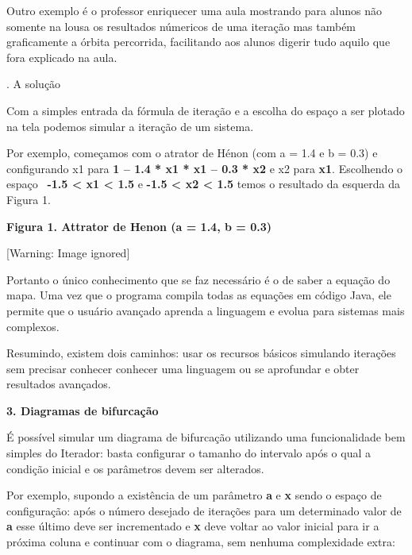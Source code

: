 \documentclass[a4paper,12pt]{article}
\begin{document}
{
 Outro exemplo \'e o professor enriquecer uma aula mostrando para alunos
n\~ao somente na lousa os resultados n\'umericos de uma itera\c{c}\~ao
mas tamb\'em graficamente a \'orbita percorrida, facilitando aos alunos
{\textquotedbl}digerir{\textquotedbl} tudo aquilo que fora explicado na
aula.}

{. A solu\c{c}\~ao}

{
Com a simples entrada da f\'ormula de itera\c{c}\~ao e a escolha do
espa\c{c}o a ser plotado na tela podemos simular a itera\c{c}\~ao de um
sistema.}

{
 Por exemplo, come\c{c}amos com o atrator de H\'enon (com a = 1.4 e b =
0.3) e configurando x1 para \textbf{1 {--} 1.4 * x1 * x1 {--} 0.3 * x2}
e x2 para \textbf{x1}\textmd{. Escolhendo o espa\c{c}o
\ }\textbf{{}-1.5 {\textless} x1 {\textless} 1.5 }\textmd{e
}\textbf{{}-1.5 {\textless} x2 {\textless} 1.5 }\textmd{temos o
resultado da esquerda da Figura 1.}}

{\centering{}\sffamily\bfseries
Figura 1. Attrator de Henon (a = 1.4, b = 0.3)
\par}

\begin{center}
 [Warning: Image ignored] %

\end{center}
{\mdseries
 Portanto o \'unico conhecimento que se faz necess\'ario \'e o de saber
a equa\c{c}\~ao do mapa. Uma vez que o programa compila todas as
equa\c{c}\~oes em c\'odigo Java, ele permite que o usu\'ario
avan\c{c}ado aprenda a linguagem e evolua para sistemas mais
complexos.}

{
 Resumindo, existem dois caminhos: usar os recursos b\'asicos simulando
itera\c{c}\~oes sem precisar conhecer conhecer uma linguagem ou se
aprofundar e obter resultados avan\c{c}ados.}

{\bfseries
3. Diagramas de bifurca\c{c}\~ao}

{
 \'E poss\'ivel simular um diagrama de bifurca\c{c}\~ao utilizando uma
funcionalidade bem simples do Iterador: basta configurar o tamanho do
intervalo ap\'os o qual a condi\c{c}\~ao inicial e os par\^ametros
devem ser alterados.}

{
 Por exemplo, supondo a exist\^encia de um par\^ametro \textbf{a} e
\textbf{x} sendo o espa\c{c}o de configura\c{c}\~ao: ap\'os o n\'umero
desejado de itera\c{c}\~oes para um determinado valor de \textbf{a
}esse \'ultimo deve ser incrementado e \textbf{x }\textmd{deve voltar
ao valor inicial para ir a pr\'oxima coluna e continuar com o diagrama,
sem nenhuma complexidade extra}:}
\end{document}
